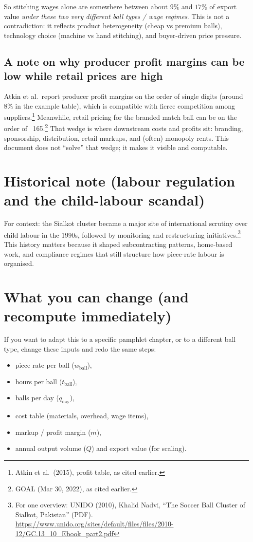 \documentclass[11pt]{article}
\newcommand{\USD}{\text{USD}}
\newcommand{\uBall}{\text{ball}}
\newcommand{\uDay}{\text{day}}
\begin{document}
\noindent
So stitching wages alone are somewhere between about \(9\%\) and \(17\%\) of export value \emph{under these two
very different ball types / wage regimes}.
This is not a contradiction: it reflects product heterogeneity (cheap vs premium balls), technology choice (machine vs hand stitching),
and buyer-driven price pressure.

\subsection{A note on why producer profit margins can be low while retail prices are high}
Atkin et al.\ report producer profit margins on the order of single digits (around \(8\%\) in the example table),
which is compatible with fierce competition among suppliers.\footnote{Atkin et al.\ (2015), profit table, as cited earlier.}
Meanwhile, retail pricing for the branded match ball can be on the order of \USD{}~165.\footnote{GOAL (Mar 30, 2022), as cited earlier.}
That wedge is where downstream costs and profits sit: branding, sponsorship, distribution, retail markups, and (often) monopoly rents.
This document does not ``solve'' that wedge; it makes it visible and computable.

\section{Historical note (labour regulation and the child-labour scandal)}
For context: the Sialkot cluster became a major site of international scrutiny over child labour in the 1990s,
followed by monitoring and restructuring initiatives.\footnote{For one overview: UNIDO (2010), Khalid Nadvi, ``The Soccer Ball Cluster of Sialkot, Pakistan'' (PDF). \url{https://www.unido.org/sites/default/files/files/2010-12/GC.13_10_Ebook_part2.pdf}}
This history matters because it shaped subcontracting patterns, home-based work, and compliance regimes that still structure
how piece-rate labour is organised.

\section{What you can change (and recompute immediately)}
If you want to adapt this to a specific pamphlet chapter, or to a different ball type, change these inputs and redo the same steps:
\begin{itemize}[leftmargin=*]
\item piece rate per ball (\(w_{\uBall}\)),
\item hours per ball (\(t_{\uBall}\)),
\item balls per day (\(q_{\uDay}\)),
\item cost table (materials, overhead, wage items),
\item markup / profit margin (\(m\)),
\item annual output volume (\(Q\)) and export value (for scaling).
\end{itemize}
\end{document}
